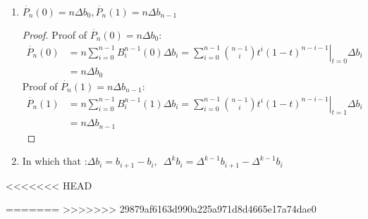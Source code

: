 \begin{remark}
	\begin{enumerate}
		\item $\dot{P_{n}}(0) = n\Delta b_{0},\dot{P_{n}}(1) = n\Delta b_{n-1}$\begin{proof}			       
        Proof of $\dot{P_{n}}(0) = n\Delta b_{0}$:
			      \begin{equation*}
				      \begin{aligned}
					      \dot{P_{n}}(0) & = n\sum\limits_{i=0}^{n-1}B_{i}^{n-1}(0)\Delta b_{i} = \left. \sum\limits_{i=0}^{n-1}\binom{n-1}{i}t_{}^{i}(1-t)_{}^{n-i-1} \right|_{t=0}\Delta b_{i} \\
					                     & = n\Delta b_{0}
				      \end{aligned}
			      \end{equation*}
			      Proof of $\dot{P_{n}}(1) = n\Delta b_{n-1}$:
			      \begin{equation*}
				      \begin{aligned}
					      \dot{P_{n}}(1) & = n\sum\limits_{i=0}^{n-1}B_{i}^{n-1}(1)\Delta b_{i} = \left. \sum\limits_{i=0}^{n-1}\binom{n-1}{i}t_{}^{i}(1-t)_{}^{n-i-1} \right|_{t=1} \Delta b_i \\
					                     & = n\Delta b_{n-1}
				      \end{aligned}
			      \end{equation*}
		      \end{proof}

		\item In which that :$\Delta b_{i} = b_{i+1}-b_{i}$,\,\, $\Delta^k b_{i} = \Delta^{k-1}b_{i+1}-\Delta^{k-1}b_{i} $
	\end{enumerate}
\end{remark}

<<<<<<< HEAD


=======
>>>>>>> 29879af6163d990a225a971d8d4665e17a74dae0
